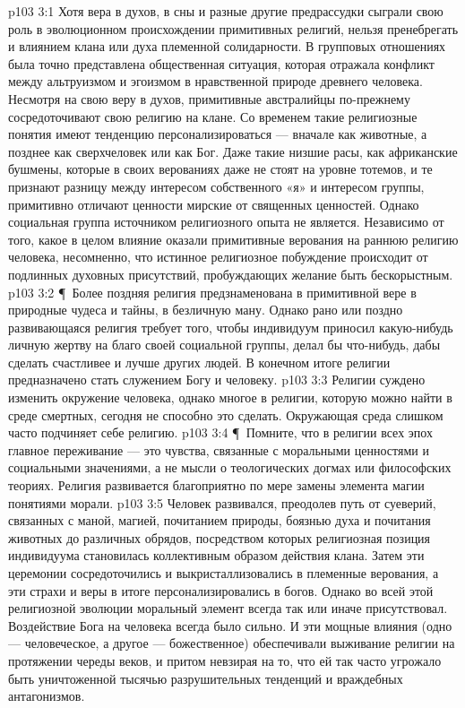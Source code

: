 \vs p103 3:1 Хотя вера в духов, в сны и разные другие предрассудки сыграли свою роль в эволюционном происхождении примитивных религий, нельзя пренебрегать и влиянием клана или духа племенной солидарности. В групповых отношениях была точно представлена общественная ситуация, которая отражала конфликт между альтруизмом и эгоизмом в нравственной природе древнего человека. Несмотря на свою веру в духов, примитивные австралийцы по\hyp{}прежнему сосредоточивают свою религию на клане. Со временем такие религиозные понятия имеют тенденцию персонализироваться --- вначале как животные, а позднее как сверхчеловек или как Бог. Даже такие низшие расы, как африканские бушмены, которые в своих верованиях даже не стоят на уровне тотемов, и те признают разницу между интересом собственного «я» и интересом группы, примитивно отличают ценности мирские от священных ценностей. Однако социальная группа источником религиозного опыта не является. Независимо от того, какое в целом влияние оказали примитивные верования на раннюю религию человека, несомненно, что истинное религиозное побуждение происходит от подлинных духовных присутствий, пробуждающих желание быть бескорыстным.
\vs p103 3:2 \P\ Более поздняя религия предзнаменована в примитивной вере в природные чудеса и тайны, в безличную ману. Однако рано или поздно развивающаяся религия требует того, чтобы индивидуум приносил какую\hyp{}нибудь личную жертву на благо своей социальной группы, делал бы что\hyp{}нибудь, дабы сделать счастливее и лучше других людей. В конечном итоге религии предназначено стать служением Богу и человеку.
\vs p103 3:3 Религии суждено изменить окружение человека, однако многое в религии, которую можно найти в среде смертных, сегодня не способно это сделать. Окружающая среда слишком часто подчиняет себе религию.
\vs p103 3:4 \P\ Помните, что в религии всех эпох главное переживание --- это чувства, связанные с моральными ценностями и социальными значениями, а не мысли о теологических догмах или философских теориях. Религия развивается благоприятно по мере замены элемента магии понятиями морали.
\vs p103 3:5 Человек развивался, преодолев путь от суеверий, связанных с маной, магией, почитанием природы, боязнью духа и почитания животных до различных обрядов, посредством которых религиозная позиция индивидуума становилась коллективным образом действия клана. Затем эти церемонии сосредоточились и выкристаллизовались в племенные верования, а эти страхи и веры в итоге персонализировались в богов. Однако во всей этой религиозной эволюции моральный элемент всегда так или иначе присутствовал. Воздействие Бога на человека всегда было сильно. И эти мощные влияния (одно --- человеческое, а другое --- божественное) обеспечивали выживание религии на протяжении череды веков, и притом невзирая на то, что ей так часто угрожало быть уничтоженной тысячью разрушительных тенденций и враждебных антагонизмов.
